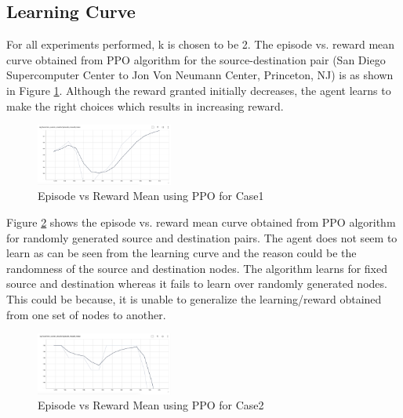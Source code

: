 \documentclass[conference]{IEEEtran}
\begin{document}
\subsection{Learning Curve}
\vspace{0.5em}
For all experiments performed, k is chosen to be 2. The episode vs. reward mean curve obtained from PPO algorithm for the source-destination pair (San Diego Supercomputer Center to Jon Von Neumann Center, Princeton, NJ) is as shown in Figure \ref{fig:case1_ppo}. Although the reward granted initially decreases, the agent learns to make the right choices which results in increasing reward.
\vspace{\baselineskip}
\begin{figure}[h]
    \centering
    \includegraphics[width=0.4\textwidth]{Figures/case1_ppo.png}
    \caption{Episode vs Reward Mean using PPO for Case1}
    \label{fig:case1_ppo}
\end{figure}

\vspace{0.5em}
Figure \ref{fig:case2_ppo} shows the episode vs. reward mean curve obtained from PPO algorithm for randomly generated source and destination pairs. The agent does not seem to learn as can be seen from the learning curve and the reason could be the randomness of the source and destination nodes. The algorithm learns for fixed source and destination whereas it fails to learn over randomly generated nodes. This could be because, it is unable to generalize the learning/reward obtained from one set of nodes to another.
\vspace{\baselineskip}
\begin{figure}[h]
    \centering
    \includegraphics[width=0.4\textwidth]{Figures/case2_ppo.png}
    \caption{Episode vs Reward Mean using PPO for Case2}
    \label{fig:case2_ppo}
\end{figure}
\end{document}
